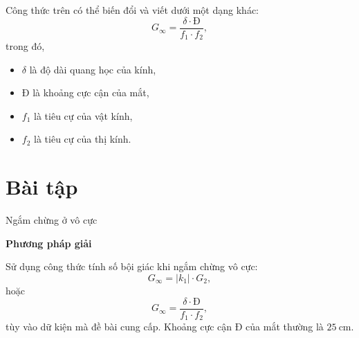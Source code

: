 Công thức trên có thể biến đổi và viết dưới một dạng khác:
\begin{equation}
G_\infty=\dfrac{\delta \cdot \text{Đ}}{f_1\cdot f_2},
\end{equation}
trong đó,
\begin{itemize}
	\item $\delta$ là độ dài quang học của kính,
	\item $\text{Đ}$ là khoảng cực cận của mắt,
	\item $f_1$ là tiêu cự của vật kính,
	\item $f_2$ là tiêu cự của thị kính.
\end{itemize}


\section{Bài tập }
\begin{dang}{Ngắm chừng ở vô cực}
\end{dang}
\textbf{Phương pháp giải}

Sử dụng công thức tính số bội giác khi ngắm chừng vô cực:
\begin{equation*}
G_\infty=|k_1|\cdot G_2,
\end{equation*}
hoặc 
\begin{equation*}
G_\infty=\dfrac{\delta \cdot \text{Đ}}{f_1\cdot f_2},
\end{equation*}
tùy vào dữ kiện mà đề bài cung cấp. Khoảng cực cận Đ của mắt thường là $25\ \text{cm}$.

